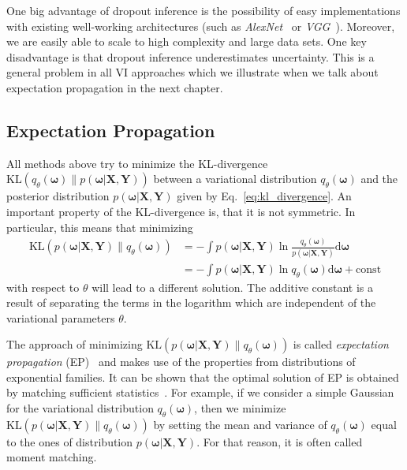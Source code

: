 \documentclass[runningheads]{llncs}
\begin{document}
One big advantage of dropout inference is the possibility of easy implementations with existing well-working architectures (such as \textit{AlexNet}~\cite{krizhevsky2012imagenet} or \textit{VGG}~\cite{vgg}).
Moreover, we are easily able to scale to high complexity and large data sets.
One key disadvantage is that dropout inference underestimates uncertainty.
This is a general problem in all VI approaches which we illustrate when we talk about expectation propagation in the next chapter.

\subsection{Expectation Propagation}
\label{sec:expectation_propagation}
All methods above try to minimize the KL-divergence $\text{KL}( q_\theta(\boldsymbol{\omega}) \| p(\boldsymbol{\omega} | \mathbf{X}, \mathbf{Y}))$ between a variational distribution $q_\theta(\boldsymbol{\omega})$ and the posterior distribution $p(\boldsymbol{\omega} | \mathbf{X}, \mathbf{Y})$ given by Eq.~\ref{eq:kl_divergence}.
An important property of the KL-divergence is, that it is not symmetric.
In particular, this means that minimizing
\begin{align}
    \mathrm{KL} \left(p(\boldsymbol{\omega} | \mathbf{X}, \mathbf{Y})  \| q_\theta(\boldsymbol{\omega})\right) &= 
    - \int p(\boldsymbol{\omega} | \mathbf{X}, \mathbf{Y}) \ln \frac{q_{\theta}(\boldsymbol{\omega})}{p(\boldsymbol{\omega} | \mathbf{X}, \mathbf{Y})} \text{d}\boldsymbol{\omega} \\
    &=  - \int p(\boldsymbol{\omega} | \mathbf{X}, \mathbf{Y}) \ln q_{\theta}\left(\boldsymbol{\omega}\right)\mathrm{d}\boldsymbol{\omega} + \mathrm{const}
\end{align}
with respect to $\theta$ will lead to a different solution. The additive constant is a result of separating the terms in the logarithm which are independent of the variational parameters $\theta$.

The approach of minimizing $\mathrm{KL}(p(\boldsymbol{\omega} | \mathbf{X}, \mathbf{Y})  \| q_\theta(\boldsymbol{\omega}))$ is called \textit{expectation propagation} (EP)~\cite{minka2004power,minka2001expectation} and makes use of the properties from distributions of exponential families.
It can be shown that the optimal solution of EP is obtained by matching sufficient statistics~\cite{bishop:2006:PRML}.
For example, if we consider a simple Gaussian for the variational distribution $q_\theta(\boldsymbol{\omega})$, then we minimize $\mathrm{KL}(p(\boldsymbol{\omega} | \mathbf{X}, \mathbf{Y})  \| q_\theta(\boldsymbol{\omega}))$ by setting the mean and variance of $q_\theta(\boldsymbol{\omega})$ equal to the ones of distribution $p(\boldsymbol{\omega} | \mathbf{X}, \mathbf{Y})$.
For that reason, it is often called moment matching.
\end{document}
